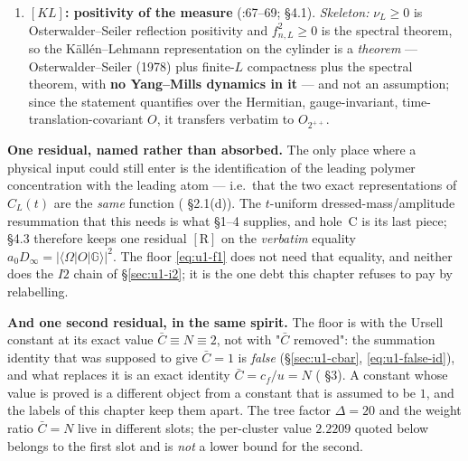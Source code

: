 \begin{enumerate}[label=\textbf{R\arabic*.},leftmargin=2.6em]
      configuration space, hence is Hilbert--Schmidt, hence compact, hence has purely discrete
      spectrum --- \emph{every} spectral point is an atom; and
      $f_1^2=\lim_te^{E_{1,L}t}C_L(t)$ uses only $\delta_L=E_{2,L}-E_{1,L}>0$ \emph{at that $L$}.
      The residue is a \emph{coefficient} and the isolation is an \emph{eigenvalue spacing}; this
      is why $m_1$ only \emph{locates} the atom that is being read and enters no inequality of
      the chain. \LT{}
\item \textbf{$[KL]$: positivity of the measure} (:67--69;
       \S4.1). \emph{Skeleton:} $\nu_L\ge0$ is Osterwalder--Seiler reflection
      positivity and $f_{n,L}^2\ge0$ is the spectral theorem, so the K\"all\'en--Lehmann
      representation on the cylinder is a \emph{theorem} --- Osterwalder--Seiler (1978) plus
      finite-$L$ compactness plus the spectral theorem, with \textbf{no Yang--Mills dynamics in
      it} --- and not an assumption; since the statement quantifies over the Hermitian,
      gauge-invariant, time-translation-covariant $O$, it transfers verbatim to $O_{2^{++}}$.
      \LT{}
\end{enumerate}

\noindent\textbf{One residual, named rather than absorbed.} The only place where a physical input
could still enter is the identification of the leading polymer concentration with the leading
atom --- i.e.\ that the two exact representations of $C_L(t)$ are the \emph{same} function
( \S2.1(d)). The $t$-uniform dressed-mass/amplitude resummation
that this needs is what  \S1--4 supplies, and hole~C is its last piece;
 \S4.3 therefore keeps one residual $[\mathrm{R}]$ on the \emph{verbatim} equality
$a_0D_\infty=|\langle\Omega|O|\mathbb{G}\rangle|^2$. The floor \eqref{eq:u1-f1} does not need
that equality, and neither does the $I2$ chain of \S\ref{sec:u1-i2}; it is the one debt this
chapter refuses to pay by relabelling.

\noindent\textbf{And one second residual, in the same spirit.} The floor is \LT{} with the Ursell
constant at its exact value $\bar C\equiv N\equiv2$, not with "$\bar C$ removed": the summation
identity that was supposed to give $\bar C=1$ is \emph{false} (\S\ref{sec:u1-cbar},
\eqref{eq:u1-false-id}), and what replaces it is an exact identity $\bar C=c_f/u=N$
( \S3). A constant whose value is proved is a different object from a
constant that is assumed to be $1$, and the labels of this chapter keep them apart. The tree
factor $\Delta=20$ and the weight ratio $\bar C=N$ live in different slots; the per-cluster value
$2.2209$ quoted below belongs to the first slot and is \emph{not} a lower bound for the second.

